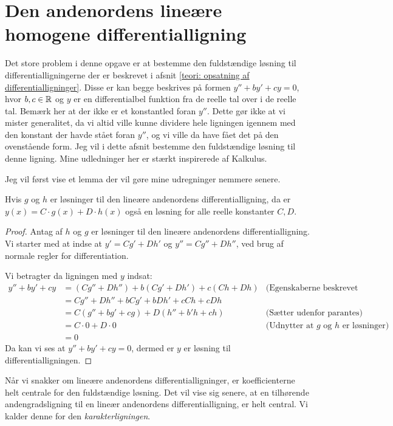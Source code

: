 \section{Den andenordens lineære homogene differentialligning}
Det store problem i denne opgave er at bestemme den fuldstændige løsning til differentialligningerne der er beskrevet i afsnit \ref{teori: opsatning af differentialligninger}.
Disse er kan begge beskrives på formen $y'' + by' + cy = 0$, hvor $b,c \in \mathbb{R}$ og $y$ er en differentialbel funktion fra de reelle tal over i de reelle tal. 
Bemærk her at der ikke er et konstantled foran $y''$. 
Dette gør ikke at vi mister generalitet, da vi altid ville kunne dividere hele ligningen igennem med den konstant der havde stået foran $y''$, og vi ville da have fået det på den ovenstående form. 
Jeg vil i dette afsnit bestemme den fuldstændige løsning til denne ligning. 
Mine udledninger her er stærkt inspirerede af Kalkulus. 

Jeg vil først vise et lemma der vil gøre mine udregninger nemmere senere.

\begin{lemma}
Hvis $g$ og $h$ er løsninger til den lineære andenordens differentialligning, da er $y(x) = C\cdot g(x) + D \cdot h(x)$ også en løsning for alle reelle konstanter $C,D$. 
\end{lemma}

\begin{proof}
Antag af $h$ og $g$ er løsninger til den lineære andenordens differentialligning. 
Vi starter med at indse at $y'=Cg' + Dh'$ og $y'' = Cg'' + Dh''$, ved brug af normale regler for differentiation. 

Vi betragter da ligningen med $y$ indsat:
\begin{align*}
y'' + by' + cy 	&= (Cg'' + Dh'') + b(Cg' + Dh') + c(Ch + Dh)	& \text{(Egenskaberne beskrevet ovenfor)}\\
				&= Cg'' + Dh'' + bCg' + bDh' + cCh + cDh		\\
				&= C(g'' + bg' + cg) + D(h'' + b'h + ch)		& \text{(Sætter udenfor parantes)}\\
				&= C\cdot 0 + D \cdot 0							& \text{(Udnytter at $g$ og $h$ er løsninger)}\\
				&= 0 
\end{align*}
Da kan vi ses at $y'' + by' + cy = 0$, dermed er $y$ er løsning til differentialligningen.
\end{proof}

Når vi snakker om lineære andenordens differentialligninger, er koefficienterne helt centrale for den fuldstændige løsning. 
Det vil vise sig senere, at en tilhørende andengradsligning til en lineær andenordens differentialligning, er helt central. Vi kalder denne for den \textit{karakterligningen}.

